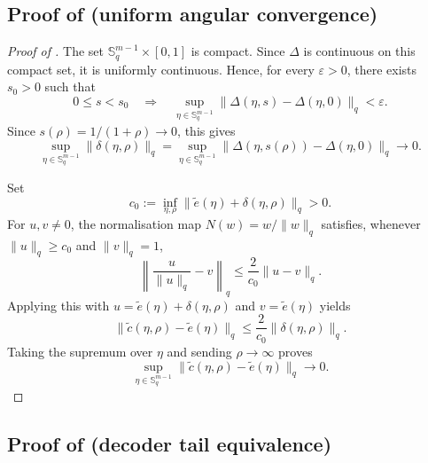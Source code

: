 \documentclass{article}
\theoremstyle{definition}
\begin{document}
\subsection{Proof of
\texorpdfstring{}{Lemma~\ref*{lem:uniform-angular-convergence}}
(uniform angular convergence)}
\label{sec:appendix:proof-uniform-angular-convergence}
\begin{proof}[Proof of ]
The set \(\mathbb{S}^{m-1}_q\times[0,1]\) is compact. Since \(\Delta\) is
continuous on this compact set, it is uniformly continuous. Hence, for every
\(\varepsilon>0\), there exists \(s_0>0\) such that
\[
0\le s<s_0
\quad\Longrightarrow\quad
\sup_{\eta\in\mathbb{S}^{m-1}_q}
\|\Delta(\eta,s)-\Delta(\eta,0)\|_q<\varepsilon.
\]
Since \(s(\rho)=1/(1+\rho)\to0\), this gives
\[
\sup_{\eta\in\mathbb{S}^{m-1}_q}
\|\delta(\eta,\rho)\|_q
=
\sup_{\eta\in\mathbb{S}^{m-1}_q}
\|\Delta(\eta,s(\rho))-\Delta(\eta,0)\|_q
\to0.
\]

Set
\[
c_0:=
\inf_{\eta,\rho}
\|\tilde e(\eta)+\delta(\eta,\rho)\|_q>0.
\]
For \(u,v\neq0\), the normalisation map \(N(w)=w/\|w\|_q\) satisfies, whenever
\(\|u\|_q\ge c_0\) and \(\|v\|_q=1\),
\[
\left\|\frac{u}{\|u\|_q}-v\right\|_q
\le
\frac{2}{c_0}\|u-v\|_q.
\]
Applying this with \(u=\tilde e(\eta)+\delta(\eta,\rho)\) and
\(v=\tilde e(\eta)\) yields
\[
\|\tilde c(\eta,\rho)-\tilde e(\eta)\|_q
\le
\frac{2}{c_0}\|\delta(\eta,\rho)\|_q.
\]
Taking the supremum over \(\eta\) and sending \(\rho\to\infty\) proves
\[
\sup_{\eta\in\mathbb{S}^{m-1}_q}
\|\tilde c(\eta,\rho)-\tilde e(\eta)\|_q
\to0.
\]
\end{proof}

\subsection{Proof of
\texorpdfstring{}{Theorem~\ref*{thm:decoder-tail-equivalence}}
(decoder tail equivalence)}
\label{sec:appendix:proof-decoder-tail-equivalence}
\end{document}
